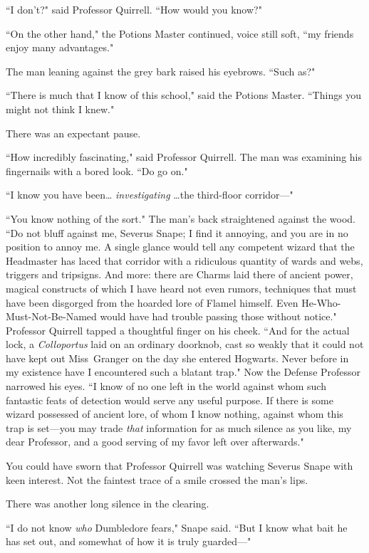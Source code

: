 ``I don't?" said Professor Quirrell. ``How would you know?"

``On the other hand," the Potions Master continued, voice still soft, ``my friends enjoy many advantages."

The man leaning against the grey bark raised his eyebrows. ``Such as?"

``There is much that I know of this school," said the Potions Master. ``Things you might not think I knew."

There was an expectant pause.

``How incredibly fascinating," said Professor Quirrell. The man was examining his fingernails with a bored look. ``Do go on."

``I know you have been{\ldots} \emph{investigating} {\ldots}the third-floor corridor---"

``You know nothing of the sort." The man's back straightened against the wood. ``Do not bluff against me, Severus Snape; I find it annoying, and you are in no position to annoy me. A single glance would tell any competent wizard that the Headmaster has laced that corridor with a ridiculous quantity of wards and webs, triggers and tripsigns. And more: there are Charms laid there of ancient power, magical constructs of which I have heard not even rumors, techniques that must have been disgorged from the hoarded lore of Flamel himself. Even He-Who-Must-Not-Be-Named would have had trouble passing those without notice." Professor Quirrell tapped a thoughtful finger on his cheek. ``And for the actual lock, a \emph{Colloportus} laid on an ordinary doorknob, cast so weakly that it could not have kept out Miss~Granger on the day she entered Hogwarts. Never before in my existence have I encountered such a blatant trap." Now the Defense Professor narrowed his eyes. ``I know of no one left in the world against whom such fantastic feats of detection would serve any useful purpose. If there is some wizard possessed of ancient lore, of whom I know nothing, against whom this trap is set---you may trade \emph{that} information for as much silence as you like, my dear Professor, and a good serving of my favor left over afterwards."

You could have sworn that Professor Quirrell was watching Severus Snape with keen interest. Not the faintest trace of a smile crossed the man's lips.

There was another long silence in the clearing.

``I do not know \emph{who} Dumbledore fears," Snape said. ``But I know what bait he has set out, and somewhat of how it is truly guarded---"

